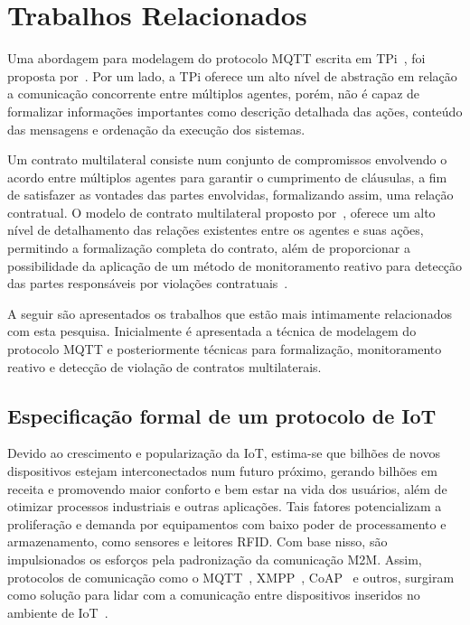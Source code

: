 \chapter{Trabalhos Relacionados}

Uma abordagem para modelagem do protocolo MQTT escrita em TPi~\cite{berger2003two}, foi proposta por~\citeauthor{aziz2016formal}. Por um lado, a TPi oferece um alto nível de abstração em relação a comunicação concorrente entre múltiplos agentes, porém, não é capaz de formalizar informações importantes como descrição detalhada das ações, conteúdo das mensagens e ordenação da execução dos sistemas.

Um contrato multilateral consiste num conjunto de compromissos envolvendo o acordo entre múltiplos agentes para garantir o cumprimento de cláusulas, a fim de satisfazer as vontades das partes envolvidas, formalizando assim, uma relação contratual. O modelo de contrato multilateral proposto por~\citeauthor{xu2004multi}, oferece um alto nível de detalhamento das relações existentes entre os agentes e suas ações, permitindo a formalização completa do contrato, além de proporcionar a possibilidade da aplicação de um método de monitoramento reativo para detecção das partes responsáveis por violações contratuais~\cite{xu2004multi, xu2005detection}.

A seguir são apresentados os trabalhos que estão mais intimamente relacionados com esta pesquisa. Inicialmente é apresentada a técnica de modelagem do protocolo MQTT e posteriormente técnicas para formalização, monitoramento reativo e detecção de violação de contratos multilaterais.  

\section{Especificação formal de um protocolo de IoT}

Devido ao crescimento e popularização da IoT, estima-se que bilhões de novos dispositivos estejam interconectados num futuro próximo, gerando bilhões em receita e promovendo maior conforto e bem estar na vida dos usuários, além de otimizar processos industriais e outras aplicações. Tais fatores potencializam a proliferação e demanda por equipamentos com baixo poder de processamento e armazenamento, como sensores e leitores RFID. Com base nisso, são impulsionados os esforços pela padronização da comunicação M2M. Assim, protocolos de comunicação como o MQTT~\cite{mqttv3.1.1}, XMPP~\cite{xmpp2011extensible}, CoAP~\cite{shelby2014constrained} e outros, surgiram como solução para lidar com a comunicação entre dispositivos inseridos no ambiente de IoT~\cite{aziz2016formal}.

